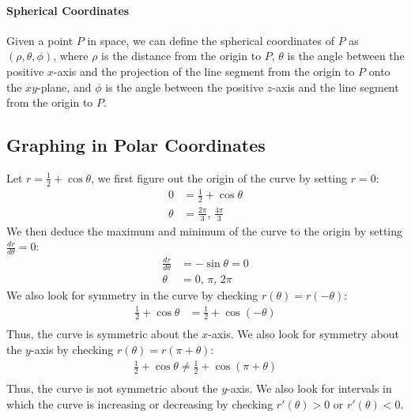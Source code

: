 \documentclass[11pt]{report}
\begin{document}
\paragraph{Spherical Coordinates} Given a point $P$ in space, we can define the spherical coordinates of $P$ as $(\rho, \theta, \phi)$, where $\rho$ is the distance from the origin to $P$, $\theta$ is the angle between the positive $x$-axis and the projection of the line segment from the origin to $P$ onto the $xy$-plane, and $\phi$ is the angle between the positive $z$-axis and the line segment from the origin to $P$.
\subsection{Graphing in Polar Coordinates}
\begin{example}
    Let $r = \frac{1}{2} + \cos \theta$, we first figure out the origin of the curve by setting $r = 0$:
    \begin{align*}
        0 &= \frac{1}{2} + \cos \theta \\
        \theta &= \frac{2\pi}{3},\, \frac{4\pi}{3}
    \end{align*}
    We then deduce the maximum and minimum of the curve to the origin by setting $\frac{dr}{d\theta} = 0$:
    \begin{align*}
        \frac{dr}{d\theta} &= -\sin \theta = 0 \\
        \theta &= 0,\, \pi,\, 2\pi
    \end{align*}
    We also look for symmetry in the curve by checking $r(\theta) = r(-\theta)$:
    \begin{align*}
        \frac{1}{2} + \cos \theta &= \frac{1}{2} + \cos(-\theta) \\
    \end{align*}
    Thus, the curve is symmetric about the $x$-axis. We also look for symmetry about the $y$-axis by checking $r(\theta) = r(\pi + \theta)$:
    \begin{align*}
        \frac{1}{2} + \cos \theta \neq \frac{1}{2} + \cos(\pi + \theta) \\
    \end{align*}
    Thus, the curve is not symmetric about the $y$-axis. We also look for intervals in which the curve is increasing or decreasing by checking $r'(\theta) > 0$ or $r'(\theta) < 0$.
\end{example}
\end{document}
